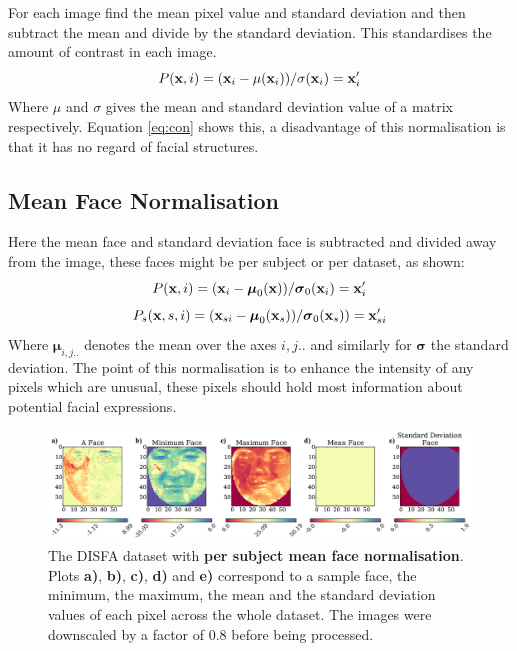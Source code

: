       For each image find the mean pixel value and standard deviation and then subtract the mean
      and divide by the standard deviation. This standardises the amount of contrast in each image.
      \begin{equation}
         P({\bf x},i)= ({\bf x}_{i} - \mu({\bf x}_{i}))/\sigma ({\bf x}_{i}) = {\bf x}_{i}'
         \label{eq:con}
      \end{equation}
      Where $\mu$ and $\sigma$ gives the mean and standard deviation value of a matrix respectively.
      Equation \ref{eq:con} shows this, a disadvantage of this normalisation is that it
      has no regard of facial structures.

    \subsection{Mean Face Normalisation} \label{sec:meanface}
      Here the mean face and standard deviation face is subtracted and divided away from the
      image, these faces might be per subject or per dataset, as shown:
      \begin{equation}
        P({\bf x},i) =  ({\bf x}_{i} - {\boldsymbol \mu}_0( {\bf x}))/{\boldsymbol \sigma}_0({\bf x}_{i})  = {\bf x}_{i}'
      \end{equation}
      \begin{equation}
        P_s({\bf x},s,i) = ({\bf x}_{si} - {\boldsymbol \mu}_{0}( {\bf x}_s))/{\boldsymbol \sigma}_{0}( {\bf x}_s))  = {\bf x}_{si}'
      \end{equation}
      Where ${\boldsymbol \mu}_{i,j..}$ denotes the mean over the axes $i,j..$ and
      similarly for ${\boldsymbol \sigma} $ the standard deviation.
      The point of this normalisation is to enhance the intensity of any pixels which
      are unusual, these pixels should hold most information about potential facial expressions.
      \begin{figure}[!h] \centering
      \includegraphics[width =\hsize]{figures/faces_per_subject_face.pdf}
      \caption{The DISFA dataset with {\bf per subject mean face normalisation}.
      Plots {\bf a)}, {\bf b)}, {\bf c)}, {\bf d)} and {\bf e)}
      correspond to a sample face, the minimum, the maximum,
      the mean and the standard deviation values of each pixel across
      the whole dataset. The images were downscaled by a factor of 0.8 before being processed.}
      \label{fig:}
      \end{figure}

